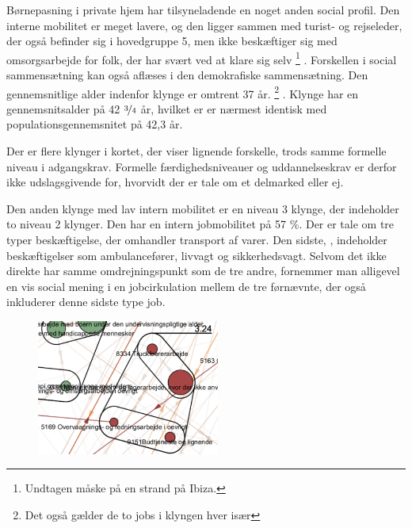 Børnepasning i private hjem har tilsyneladende en noget anden social profil. Den interne mobilitet er meget lavere, og den ligger sammen med turist- og rejseleder, der også befinder sig i hovedgruppe 5, men ikke beskæftiger sig med omsorgsarbejde for folk, der har svært ved at klare sig selv%
%
\footnote{ Undtagen måske på en strand på Ibiza.}%
%
. Forskellen i social sammensætning kan også aflæses i den demokrafiske sammensætning. Den gennemsnitlige alder indenfor klynge  er omtrent 37 år.%
%
\footnote{ Det også gælder de to jobs i klyngen hver især}%
%
. Klynge  har en gennemsnitsalder på 42 $\nicefrac{3}{4}$ år, hvilket er er nærmest identisk med populationsgennemsnitet på 42,3 år. %

Der er flere klynger i kortet, der viser lignende forskelle, trods samme formelle niveau i adgangskrav. Formelle færdighedsniveauer og uddannelseskrav er derfor ikke udslagsgivende for, hvorvidt der er tale om et delmarked eller ej. %

Den anden klynge  med lav intern mobilitet er en niveau 3 klynge, der indeholder to niveau 2 klynger. Den har en intern jobmobilitet på 57 \%. Der er tale om tre typer beskæftigelse, der omhandler transport af varer. Den sidste, , indeholder beskæftigelser som ambulancefører, livvagt og sikkerhedsvagt. Selvom det ikke direkte har samme omdrejningspunkt som de tre andre, fornemmer man alligevel en vis social mening i en jobcirkulation mellem de tre førnævnte, der også inkluderer denne sidste type job. 

%
\begin{figure}
  \vspace{-20pt}
  \begin{center}
    \includegraphics[width=6cm]{fig/segzoom/seg_3_24.pdf}
   \caption{}
   \label{fig_delanalyse1_zoom_3_24}
  \end{center}
  \vspace{-20pt}
\end{figure}
%

